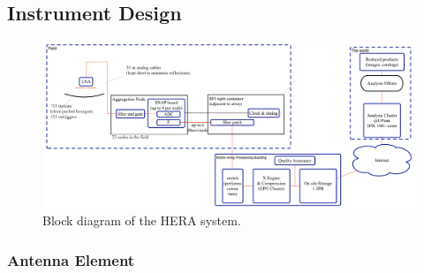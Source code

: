 \documentclass[preprint]{aastex}
\begin{document}
\subsection{Instrument Design}
\label{InstDes}
%
%

\begin{figure}[h]
\centering
\includegraphics[width=\textwidth]{plots/Engineering/HERA_high_level_block_diagram.png}
\caption{\small
Block diagram of the HERA system.}
\label{fig:blockDiagram} 
\end{figure}

\subsubsection{Antenna Element}
\end{document}
